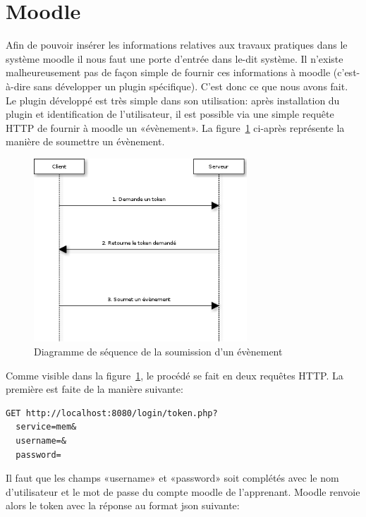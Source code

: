 \documentclass[a4paper,11pt]{report}
\begin{document}
\section{Moodle}

Afin de pouvoir insérer les informations relatives aux travaux pratiques dans le système moodle il nous faut une porte d'entrée dans le-dit système. Il n'existe malheureusement pas de façon simple de fournir ces informations à moodle (c'est-à-dire sans développer un plugin spécifique).
C'est donc ce que nous avons fait. Le plugin développé est très simple dans son utilisation: après installation du plugin et identification de l'utilisateur, il est possible via une simple requête HTTP de fournir à moodle un «évènement». La figure~\ref{seq-submit-event} ci-après représente la manière de soumettre un évènement.

\begin{figure}[h]
  \begin{center}
    \caption{\label{seq-submit-event} Diagramme de séquence de la soumission d'un évènement}
    \includegraphics[width=8cm, keepaspectratio=true]{mem-seq-submit-event.png}
   \end{center}
\end{figure}

Comme visible dans la figure~\ref{seq-submit-event}, le procédé se fait en deux requêtes HTTP. La première est faite de la manière suivante:

\begin{lstlisting}[caption={Requête d'un token}]
GET http://localhost:8080/login/token.php?
  service=mem&
  username=&
  password=
\end{lstlisting}

Il faut que les champs «username» et «password» soit complétés avec le nom d'utilisateur et le mot de passe du compte moodle de l'apprenant.
Moodle renvoie alors le token avec la réponse au format json suivante:
\end{document}
